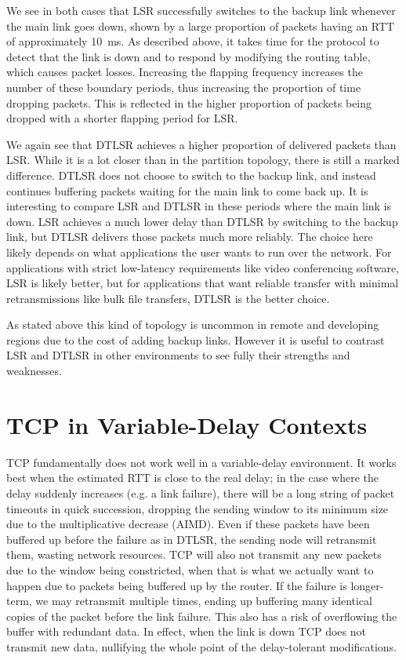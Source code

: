 \documentclass[withindex,glossary,openany]{cam-thesis}
\begin{document}
We see in both cases that LSR successfully switches to the backup link whenever the main link goes down, shown by a large proportion of packets having an RTT of approximately \SI{10}{\ms}. As described above, it takes time for the protocol to detect that the link is down and to respond by modifying the routing table, which causes packet losses. Increasing the flapping frequency increases the number of these boundary periods, thus increasing the proportion of time dropping packets. This is reflected in the higher proportion of packets being dropped with a shorter flapping period for LSR.

We again see that DTLSR achieves a higher proportion of delivered packets than LSR. While it is a lot closer than in the partition topology, there is still a marked difference. DTLSR does not choose to switch to the backup link, and instead continues buffering packets waiting for the main link to come back up. It is interesting to compare LSR and DTLSR in these periods where the main link is down. LSR achieves a much lower delay than DTLSR by switching to the backup link, but DTLSR delivers those packets much more reliably. The choice here likely depends on what applications the user wants to run over the network. For applications with strict low-latency requirements like video conferencing software, LSR is likely better, but for applications that want reliable transfer with minimal retransmissions like bulk file transfers, DTLSR is the better choice.

As stated above this kind of topology is uncommon in remote and developing regions due to the cost of adding backup links. However it is useful to contrast LSR and DTLSR in other environments to see fully their strengths and weaknesses.

\section{TCP in Variable-Delay Contexts}

TCP fundamentally does not work well in a variable-delay environment. It works best when the estimated RTT is close to the real delay; in the case where the delay suddenly increases (e.g. a link failure), there will be a long string of packet timeouts in quick succession, dropping the sending window to its minimum size due to the multiplicative decrease (AIMD). Even if these packets have been buffered up before the failure as in DTLSR, the sending node will retransmit them, wasting network resources. TCP will also not transmit any new packets due to the window being constricted, when that is what we actually want to happen due to packets being buffered up by the router. If the failure is longer-term, we may retransmit multiple times, ending up buffering many identical copies of the packet before the link failure. This also has a risk of overflowing the buffer with redundant data. In effect, when the link is down TCP does not transmit new data, nullifying the whole point of the delay-tolerant modifications.
\end{document}
